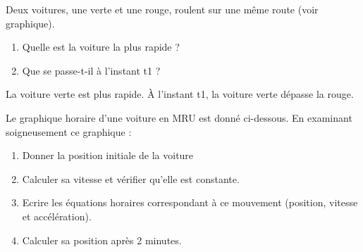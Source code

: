 \begin{exercise}
    Deux voitures, une verte et une rouge, roulent sur une même route (voir graphique).
    \begin{enumerate}[label=\alph*)]
        \item Quelle est la voiture la plus rapide ?
        \item Que se passe-t-il à l'instant t1 ?
    \end{enumerate}

\end{exercise}
\begin{solution}
    La voiture verte est plus rapide. À l'instant t1, la voiture verte dépasse la rouge.
\end{solution}



\begin{exercise}
    Le graphique horaire d'une voiture en MRU est donné ci-dessous. En examinant soigneusement ce graphique :
    \begin{enumerate}[label=\alph*)]
        \item Donner la position initiale de la voiture
        \item Calculer sa vitesse et vérifier qu'elle est constante.
        \item Ecrire les équations horaires correspondant à ce mouvement (position, vitesse et accélération).
        \item Calculer sa position après 2 minutes.
    \end{enumerate}
\end{exercise}
\begin{solution}
\end{solution}

